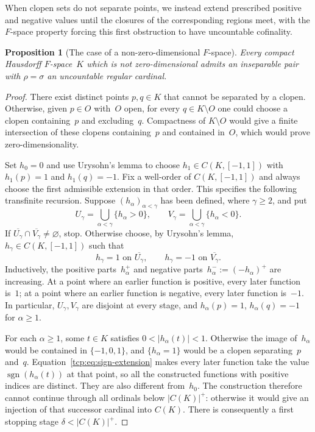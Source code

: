 \documentclass[preprint,12pt,nopreprintline]{elsarticle}
\newtheorem{proposition}[theorem]{Proposition}
\theoremstyle{definition}
\theoremstyle{remark}
\numberwithin{equation}{section}
\begin{document}
When clopen sets do not separate points, we instead extend prescribed
positive and negative values until the closures of the corresponding
regions meet, with the $F$-space property forcing this first
obstruction to have uncountable cofinality.

\begin{proposition}[The case of a non-zero-dimensional $F$-space]
\label{tcp:prop:non-zero-dimensional}
Every compact Hausdorff $F$-space~$K$ which is not zero-dimensional
admits an inseparable pair with $\rho=\sigma$ an uncountable regular
cardinal.
\end{proposition}

\begin{proof}
There exist distinct points $p,q\in K$ that cannot be separated by a clopen. Otherwise, given $p\in O$ with~$O$ open, for every
$q\in K\setminus O$ one could choose a clopen containing~$p$ and excluding~$q$. Compactness of $K\setminus O$ would give a finite
intersection of these clopens containing~$p$ and contained in~$O$, which would prove zero-dimensionality.

Set $h_0=0$ and use Urysohn's lemma to choose $h_1\in C(K,[-1,1])$ with $h_1(p)=1$ and $h_1(q)=-1$.
Fix a well-order of $C(K,[-1,1])$ and always choose the first admissible extension in that order. This specifies the following transfinite recursion. Suppose $(h_\alpha)_{\alpha<\gamma}$ has been defined, where $\gamma\ge2$,
and put
\[
 U_\gamma=\bigcup_{\alpha<\gamma}\{h_\alpha>0\},\qquad
 V_\gamma=\bigcup_{\alpha<\gamma}\{h_\alpha<0\}.
\]
If $\overline{U_\gamma}\cap\overline{V_\gamma}\ne\varnothing$, stop. Otherwise choose, by Urysohn's lemma,
$h_\gamma\in C(K,[-1,1])$ such that
\begin{equation}
 h_\gamma=1\text{ on }\overline{U_\gamma},\qquad
 h_\gamma=-1\text{ on }\overline{V_\gamma}.
 \label{tcp:eq:sign-extension}
\end{equation}
Inductively, the positive parts~$h_\alpha^+$ and negative parts~$h_\alpha^-:=(-h_\alpha)^+$ are increasing. At a point where
an earlier function is positive, every later function is~$1$; at a point where an earlier function is negative, every later
function is~$-1$. In particular, $U_\gamma,V_\gamma$ are disjoint at every stage, and $h_\alpha(p)=1$, $h_\alpha(q)=-1$ for $\alpha\ge1$.

For each $\alpha\ge1$, some $t\in K$ satisfies $0<|h_\alpha(t)|<1$. Otherwise the image of~$h_\alpha$ would be
contained in $\{-1,0,1\}$, and $\{h_\alpha=1\}$ would be a clopen separating~$p$ and~$q$. Equation~\eqref{tcp:eq:sign-extension} makes every later function take the value $\operatorname{sgn}(h_\alpha(t))$ at that point, so all the constructed functions with positive indices are distinct. They are also different from~$h_0$. The construction therefore cannot continue through all ordinals below $|C(K)|^+$: otherwise it would give an injection of that successor cardinal into $C(K)$. There is consequently a first stopping stage $\delta<|C(K)|^+$.


\end{proof}
\end{document}
